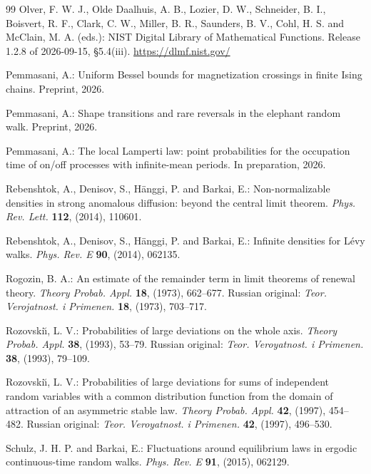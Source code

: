 \documentclass[EJP,preprint]{ejpecp}
\theoremstyle{ejpecpbodyit}
\begin{document}
\begin{thebibliography}{99}
 Olver, F. W. J., Olde Daalhuis, A. B., Lozier, D. W.,
  Schneider, B. I., Boisvert, R. F., Clark, C. W., Miller, B. R., Saunders,
  B. V., Cohl, H. S. and McClain, M. A. (eds.): NIST Digital Library of
  Mathematical Functions. Release 1.2.8 of 2026-09-15, \S5.4(iii).
  \url{https://dlmf.nist.gov/}

 Pemmasani, A.: Uniform Bessel bounds for magnetization
  crossings in finite Ising chains. Preprint, 2026. 

 Pemmasani, A.: Shape transitions and rare reversals in the
  elephant random walk. Preprint, 2026.

 Pemmasani, A.: The local Lamperti law: point probabilities for the
  occupation time of on/off processes with infinite-mean periods. In preparation, 2026.

 Rebenshtok, A., Denisov, S., H\"anggi, P. and Barkai, E.:
  Non-normalizable densities in strong anomalous diffusion: beyond the central
  limit theorem. \emph{Phys. Rev. Lett.} \textbf{112}, (2014), 110601.

 Rebenshtok, A., Denisov, S., H\"anggi, P. and Barkai, E.:
  Infinite densities for L\'evy walks. \emph{Phys. Rev. E} \textbf{90},
  (2014), 062135.

 Rogozin, B. A.: An estimate of the remainder term in
  limit theorems of renewal theory. \emph{Theory Probab. Appl.} \textbf{18},
  (1973), 662--677. Russian original: \emph{Teor. Verojatnost. i Primenen.}
  \textbf{18}, (1973), 703--717. 

 Rozovski\u{\i}, L. V.: Probabilities of large deviations
  on the whole axis. \emph{Theory Probab. Appl.} \textbf{38}, (1993), 53--79.
  Russian original: \emph{Teor. Veroyatnost. i Primenen.} \textbf{38}, (1993),
  79--109. 

 Rozovski\u{\i}, L. V.: Probabilities of large deviations
  for sums of independent random variables with a common distribution function
  from the domain of attraction of an asymmetric stable law. \emph{Theory Probab.
  Appl.} \textbf{42}, (1997), 454--482. Russian original: \emph{Teor.
  Veroyatnost. i Primenen.} \textbf{42}, (1997), 496--530. 

 Schulz, J. H. P. and Barkai, E.: Fluctuations around
  equilibrium laws in ergodic continuous-time random walks. \emph{Phys. Rev.
  E} \textbf{91}, (2015), 062129. 


\end{thebibliography}
\end{document}
